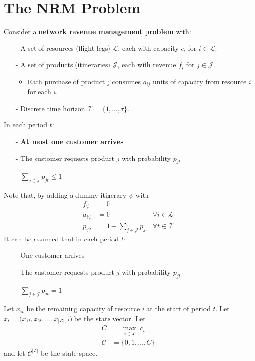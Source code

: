 \documentclass[11pt]{article}
\begin{document}
\section{The NRM Problem}

Consider a \textbf{network revenue management problem} with:
\begin{itemize}[itemsep=0pt,parsep=0pt]
\item[-] A set of resources (flight legs) $\mathcal{L}$, each with capacity $c_i$ for $i\in \mathcal{L}$. 
\item[-] A set of products (itineraries) $\mathcal{J}$, each with revenue $f_j$ for $j\in \mathcal{J}$. 
    \begin{itemize}[itemsep=0pt,parsep=0pt]
    \item Each purchase of product $j$ consumes $a_{ij}$ units of capacity from resource $i$ for each $i$. 
    \end{itemize}
\item[-] Discrete time horizon $\mathcal{T}=\{1,\ldots,\tau\}$. 
\end{itemize}

\noindent
In each period $t$:
\begin{itemize}[itemsep=0pt,parsep=0pt]
\item[-] \textbf{At most one customer arrives}
\item[-] The customer requests product $j$ with probability $p_{jt}$
\item[-] $\sum_{j\in \mathcal{J}} p_{jt} \le 1$
\end{itemize}

\noindent
Note that, by adding a dummy itinerary $\psi$ with 
\begin{align*}
    f_{\psi} &= 0 \\
    a_{i\psi} &= 0 & \forall i \in \mathcal{L} \\
    p_{\psi t} &= 1 - \sum_{j\in \mathcal{J}} p_{jt} & \forall t \in \mathcal{T}
\end{align*}
It can be assumed that in each period $t$:
\begin{itemize}[itemsep=0pt,parsep=0pt]
\item[-] One customer arrives
\item[-] The customer requests product $j$ with probability $p_{jt}$
\item[-] $\sum_{j\in \mathcal{J}} p_{jt} = 1$
\end{itemize}

\noindent
Let $x_{it}$ be the remaining capacity of resource $i$ at the start of period $t$. 
Let $x_t = \bigl(x_{1t}, x_{2t}, \dots, x_{|\mathcal L|,\,t}\bigr)$ be the state vector. 
Let
\begin{align*}
    C &= \max_{\,i\in\mathcal L}\;c_i \\
    \mathcal{C} &= \{0, 1, \ldots, C\} 
\end{align*}
and let $\mathcal{C}^{|\mathcal{L}|}$ be the state space.
\end{document}
